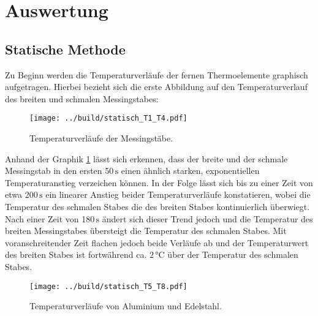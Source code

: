 


\section{Auswertung}
\label{sec:Auswertung}

\subsection{Statische Methode}
\label{sec:Statische Methode}

Zu Beginn werden die Temperaturverläufe der fernen Thermoelemente graphisch aufgetragen. Hierbei bezieht sich die erste Abbildung
auf den Temperaturverlauf des breiten und schmalen Messingstabes:

\begin{figure}[H]
  \centering
  \texttt{[image: ../build/statisch\_T1\_T4.pdf]}
  \caption{Temperaturverläufe der Messingstäbe.}
  \label{fig:statisch1}
\end{figure}

Anhand der Graphik \ref{fig:statisch1} lässt sich erkennen, dass der breite und der schmale Messingstab in den ersten 50\,$\unit{\second}$
einen ähnlich starken, exponentiellen Temperaturanstieg verzeichen können. In der Folge lässt sich bis zu einer Zeit von etwa 
200\,$\unit{\second}$ ein linearer Anstieg beider Temperaturverläufe konstatieren, wobei die Temperatur des schmalen Stabes die 
des breiten Stabes kontinuierlich überwiegt. Nach einer Zeit von 180\,$\unit{\second}$ ändert sich dieser Trend jedoch und die
Temperatur des breiten Messingstabes übersteigt die Temperatur des schmalen Stabes. Mit voranschreitender Zeit flachen jedoch beide
Verläufe ab und der Temperaturwert des breiten Stabes ist fortwährend ca. $2\,\unit{\celsius}$ über der Temperatur des schmalen Stabes.
\newpage

\begin{figure}[H]
  \centering
  \texttt{[image: ../build/statisch\_T5\_T8.pdf]}
  \caption{Temperaturverläufe von Aluminium und Edelstahl.}
  \label{fig:statisch2}
\end{figure}

